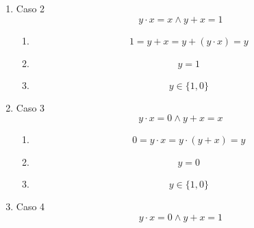 \begin{enumerate}
\begin{enumerate}
\begin{enumerate}
\begin{enumerate}
        \begin{enumerate}
        \def\labelenumv{\arabic{enumv}.}
        \tightlist
        \item
          \[{{1 = {{({y \cdot x})} + {({\overline{y} \cdot \overline{x}})}}} = y} \odot x\]
        \item
          \[y = x\]
        \item
          \[y \in {\{{x,\overline{x}}\}}\]
        \end{enumerate}
      \item
        Caso 2 \[{{y \cdot x} = {{x \land y} + x}} = 1\]

        \begin{enumerate}
        \def\labelenumv{\arabic{enumv}.}
        \tightlist
        \item
          \[{{1 = {y + x}} = {y + {({y \cdot x})}}} = y\]
        \item
          \[y = 1\]
        \item
          \[y \in {\{ 1,0\}}\]
        \end{enumerate}
      \item
        Caso 3 \[{{y \cdot x} = {{0 \land y} + x}} = x\]

        \begin{enumerate}
        \def\labelenumv{\arabic{enumv}.}
        \tightlist
        \item
          \[{{0 = {y \cdot x}} = {y \cdot {({y + x})}}} = y\]
        \item
          \[y = 0\]
        \item
          \[y \in {\{ 1,0\}}\]
        \end{enumerate}
      \item
        Caso 4 \[{{y \cdot x} = {{0 \land y} + x}} = 1\]


\end{enumerate}
\end{enumerate}
\end{enumerate}
\end{enumerate}
